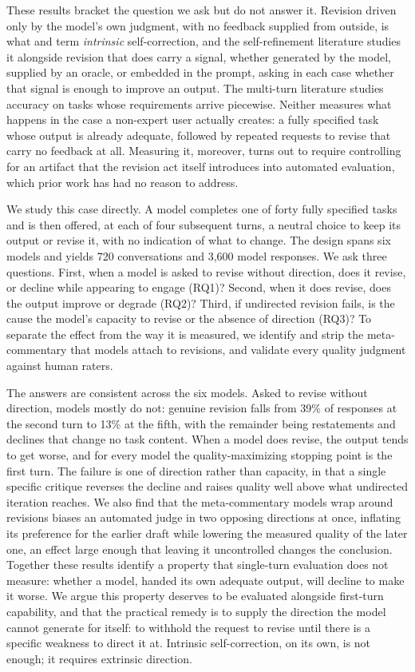 These results bracket the question we ask but do not answer it. Revision driven only by the model's
own judgment, with no feedback supplied from outside, is what \citet{kamoi2024selfcorrection} and
\citet{huang2024large} term \emph{intrinsic} self-correction, and the self-refinement literature
studies it alongside revision that does carry a signal, whether generated by the model, supplied by
an oracle, or embedded in the prompt, asking in each case whether that signal is enough to improve an
output. The multi-turn literature studies accuracy on tasks whose requirements arrive piecewise.
Neither measures what happens in the case a non-expert user actually creates: a fully specified task
whose output is already adequate, followed by repeated requests to revise that carry no feedback at
all. Measuring it,
moreover, turns out to require controlling for an artifact that the revision act itself introduces
into automated evaluation, which prior work has had no reason to address.

We study this case directly. A model completes one of forty fully specified tasks and is then offered,
at each of four subsequent turns, a neutral choice to keep its output or revise it, with no indication
of what to change. The design spans six models and yields 720 conversations and 3,600 model responses.
We ask three questions. First, when a model is asked to revise without direction, does it revise, or
decline while appearing to engage (RQ1)? Second, when it does revise, does the output improve or
degrade (RQ2)? Third, if undirected revision fails, is the cause the model's capacity to revise or the
absence of direction (RQ3)? To separate the effect from the way it is measured, we identify and strip
the meta-commentary that models attach to revisions, and validate every quality judgment against human
raters.

The answers are consistent across the six models. Asked to revise without direction, models mostly do
not: genuine revision falls from 39\% of responses at the second turn to 13\% at the fifth, with the
remainder being restatements and declines that change no task content. When a model does revise, the
output tends to get worse, and for every model the quality-maximizing stopping point is the first turn.
The failure is one of direction rather than capacity, in that a single specific critique reverses the
decline and raises quality well above what undirected iteration reaches. We also find that the
meta-commentary models wrap around revisions biases an automated judge in two opposing directions at
once, inflating its preference for the earlier draft while lowering the measured quality of the later
one, an effect large enough that leaving it uncontrolled changes the conclusion. Together these
results identify a property that single-turn evaluation does not measure: whether a model, handed its
own adequate output, will decline to make it worse. We argue this property deserves to be evaluated
alongside first-turn capability, and that the practical remedy is to supply the direction the model
cannot generate for itself: to withhold the request to revise until there is a specific weakness to
direct it at. Intrinsic self-correction, on its own, is not enough; it requires extrinsic direction.
